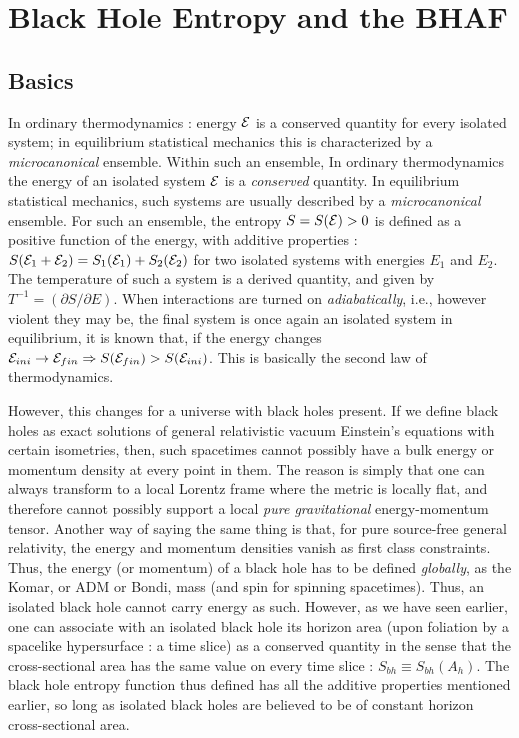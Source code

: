 \documentclass[11pt]{article}
\begin{document}
\section{Black Hole Entropy and the BHAF}

\subsection{Basics}

In ordinary thermodynamics : energy ${\cal E}$ is a conserved quantity for every isolated system; in equilibrium statistical mechanics this is characterized by a {\it microcanonical} ensemble. Within such an ensemble, In ordinary thermodynamics the energy of an isolated system ${\cal E}$ is a {\it conserved} quantity. In equilibrium statistical mechanics, such systems are usually described by a {\it microcanonical} ensemble. For such an ensemble, the entropy $S=S({\cal E}) > 0$ is defined as a positive function of the energy, with additive properties : $S({\cal E}_1 + {\cal E}_2) = S_1({\cal E}_1) + S_2({\cal E}_2)$ for two isolated systems with energies $E_1$ and $E_2$. The temperature of such a system is a derived quantity, and given by $T^{-1} = (\partial S/\partial E)$. When interactions are turned on {\it adiabatically}, i.e., however violent they may be, the final system is once again an isolated system in equilibrium, it is known that, if the energy changes ${\cal E}_{ini} \rightarrow {\cal E}_{fin} \Rightarrow S({\cal E}_{fin}) > S({\cal E}_{ini})$. This is basically the second law of thermodynamics.  

However, this changes for a universe with black holes present. If we define black holes as exact solutions of general relativistic vacuum Einstein's equations with certain isometries, then, such spacetimes cannot possibly have a bulk energy or momentum density at every point in them. The reason is simply that one can always transform to a local Lorentz frame where the metric is locally flat, and therefore cannot possibly support a local {\it pure gravitational} energy-momentum tensor. Another way of saying the same thing is that, for pure source-free general relativity, the energy and momentum densities vanish as first class constraints. Thus, the energy (or momentum) of a black hole has to be defined {\it globally}, as the Komar, or ADM or Bondi, mass (and  spin for spinning spacetimes). Thus, an isolated black hole cannot carry energy as such. However, as we have seen earlier, one can associate with an isolated black hole its horizon area (upon foliation by a spacelike hypersurface : a time slice) as a conserved quantity in the sense that the cross-sectional area has the same value on every time slice : $S_{bh} \equiv S_{bh}(A_h)$. The black hole entropy function thus defined has all the additive properties mentioned earlier, so long as isolated black holes are believed to be of constant horizon cross-sectional area. 
\end{document}
